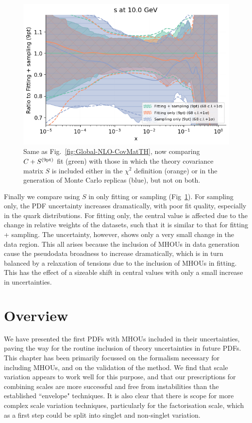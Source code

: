 \begin{figure}[h]
\begin{center}
       \includegraphics[scale=0.44]{mhous/plots/jplots/j3s.png}
   \caption{\small Same as Fig.~\ref{fig:Global-NLO-CovMatTH}, now comparing $C+S^{(\rm 9pt)}$ fit (green) with those in which
     the theory covariance matrix $S$ is included either in the $\chi^2$
     definition (orange) or in the generation of Monte Carlo replicas (blue), but not on both.
    \label{fig:Global-NLO-CovMatTH-tests} }
  \end{center}
\end{figure}
Finally we compare using $S$ in only fitting or sampling (Fig~\ref{fig:Global-NLO-CovMatTH-tests}). For sampling only, the PDF uncertainty increases dramatically, with poor fit quality, especially in the quark distributions. For fitting only, the central value is affected due to the change in relative weights of the datasets, such that it is similar to that for fitting + sampling. The uncertainty, however, shows only a very small change in the data region. This all arises because the inclusion of MHOUs in data generation cause the pseudodata broadness to increase dramatically, which is in turn balanced by a relaxation of tensions due to the inclusion of MHOUs in fitting. This has the effect of a sizeable shift in central values with only a small increase in uncertainties. 

\section{Overview}
\label{sec:overview}
We have presented the first PDFs with MHOUs included in their uncertainties, paving the way for the routine inclusion of theory uncertainties in future PDFs. This chapter has been primarily focussed on the formalism necessary for including MHOUs, and on the validation of the method. We find that scale variation appears to work well for this purpose, and that our prescriptions for combining scales are more successful and free from instabilities than the established ``envelope" techniques. It is also clear that there is scope for more complex scale variation techniques, particularly for the factorisation scale, which as a first step could be split into singlet and non-singlet variation. 

